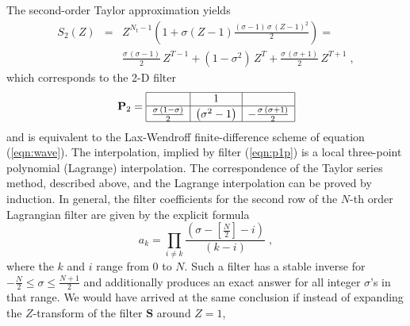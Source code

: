 \par
The second-order Taylor approximation yields
\begin{eqnarray}
  S_2(Z) & = & Z^{N_t-1} \left(1 + 
    \sigma (Z-1) {\frac{(\sigma -1) \,\sigma\,(Z -1)^2}{2}}\right) = 
\nonumber \\
  & & \frac{\sigma\,(\sigma-1)}{2}\, Z^{T-1} +
  \left(1-\sigma^2\right)\, Z^{T} +
  \frac{\sigma\,(\sigma+1)}{2}\, Z^{T+1}\;,   
  \label{eqn:pthree}
\end{eqnarray}
which corresponds to the 2-D filter
\begin{equation}
  \label{eqn:p2}
  \mathbf{P}_2 =
  \begin{array}{|c|c|c|}
    \hline
    & 1 & \\ \hline
    \frac{\sigma\,(1-\sigma)}{2} &  \left(\sigma^2-1\right) & -\frac{\sigma\,(\sigma+1)}{2} \\ \hline
  \end{array}
\end{equation}
and is equivalent to the Lax-Wendroff finite-difference scheme
of equation (\ref{eqn:wave}). The interpolation, implied by filter
(\ref{eqn:p1p}) is a local three-point polynomial (Lagrange)
interpolation. The correspondence of the Taylor series method,
described above, and the Lagrange interpolation can be proved by
induction. In general, the filter coefficients for the second row of
the $N$-th order Lagrangian filter are given by the explicit formula
\begin{equation}
  \label{eqn:coeff}
  a_{k} = \prod_{i \neq k} \frac{(\sigma-\left[\frac{N}{2}\right]-i)}{(k-i)}\;,
\end{equation}
where the $k$ and $i$ range from $0$ to $N$. Such a filter has a
stable inverse for $-\frac{N}{2} \le \sigma \le \frac{N+1}{2}$ and
additionally produces an exact answer for all integer $\sigma$'s in
that range. We would have arrived at the same conclusion if instead of
expanding the $Z$-transform of the filter $\mathbf{S}$ around $Z=1$,
